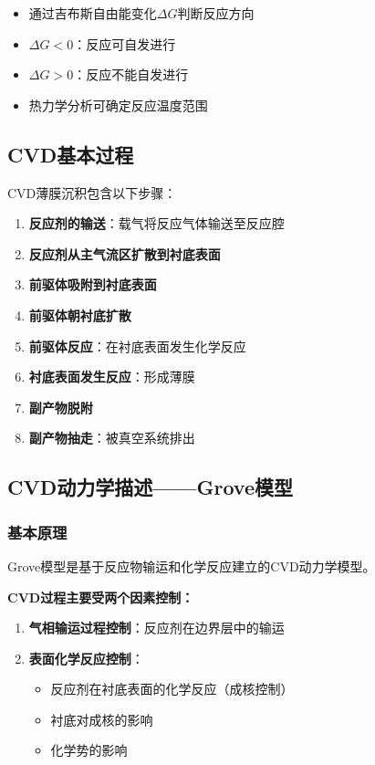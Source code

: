 \documentclass[UTF8,12pt,a4paper]{ctexart}
\begin{document}
\begin{itemize}
    \item 通过吉布斯自由能变化$\Delta G$判断反应方向
    \item $\Delta G < 0$：反应可自发进行
    \item $\Delta G > 0$：反应不能自发进行
    \item 热力学分析可确定反应温度范围
\end{itemize}

\subsection{CVD基本过程}

CVD薄膜沉积包含以下步骤：

\begin{enumerate}
    \item \textbf{反应剂的输送}：载气将反应气体输送至反应腔
    \item \textbf{反应剂从主气流区扩散到衬底表面}
    \item \textbf{前驱体吸附到衬底表面}
    \item \textbf{前驱体朝衬底扩散}
    \item \textbf{前驱体反应}：在衬底表面发生化学反应
    \item \textbf{衬底表面发生反应}：形成薄膜
    \item \textbf{副产物脱附}
    \item \textbf{副产物抽走}：被真空系统排出
\end{enumerate}

\subsection{CVD动力学描述——Grove模型}

\subsubsection{基本原理}

Grove模型是基于反应物输运和化学反应建立的CVD动力学模型。

\textbf{CVD过程主要受两个因素控制：}
\begin{enumerate}
    \item \textbf{气相输运过程控制}：反应剂在边界层中的输运
    \item \textbf{表面化学反应控制}：
    \begin{itemize}
        \item 反应剂在衬底表面的化学反应（成核控制）
        \item 衬底对成核的影响
        \item 化学势的影响
    \end{itemize}
\end{enumerate}
\end{document}
